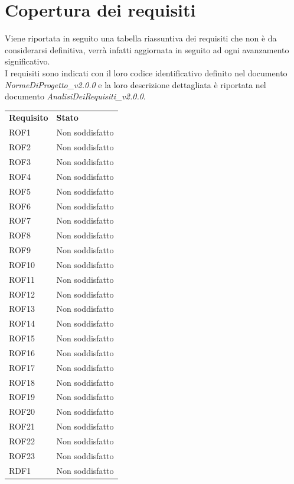 \section{Copertura dei requisiti}
Viene riportata in seguito una tabella riassuntiva dei requisiti che non è da considerarsi definitiva, verrà infatti aggiornata in seguito ad ogni avanzamento significativo. \\
I requisiti sono indicati con il loro codice identificativo definito nel documento \textit{NormeDiProgetto\_v2.0.0} e la loro descrizione dettagliata è riportata nel documento \textit{AnalisiDeiRequisiti\_v2.0.0}.
\begin{longtable}{| p{2.5cm} | p{3cm} |}
	\rowcolor{LightBlue}
	\color{white}\bfseries Requisito & \color{white}\bfseries Stato \\
	ROF1 & Non soddisfatto \\ \hline
	ROF2 & Non soddisfatto \\ \hline
	ROF3 & Non soddisfatto \\ \hline
	ROF4 & Non soddisfatto \\ \hline
	ROF5 & Non soddisfatto \\ \hline
	ROF6 & Non soddisfatto \\ \hline
	ROF7 & Non soddisfatto \\ \hline
	ROF8 & Non soddisfatto \\ \hline
	ROF9 & Non soddisfatto \\ \hline
	ROF10 & Non soddisfatto \\ \hline
	ROF11 & Non soddisfatto \\ \hline
	ROF12 & Non soddisfatto \\ \hline
	ROF13 & Non soddisfatto \\ \hline
	ROF14 & Non soddisfatto \\ \hline
	ROF15 & Non soddisfatto \\ \hline
	ROF16 & Non soddisfatto \\ \hline
	ROF17 & Non soddisfatto \\ \hline
	ROF18 & Non soddisfatto \\ \hline
	ROF19 & Non soddisfatto \\ \hline
	ROF20 & Non soddisfatto \\ \hline
	ROF21 & Non soddisfatto \\ \hline
	ROF22 & Non soddisfatto \\ \hline
	ROF23 & Non soddisfatto \\ \hline
	RDF1 & Non soddisfatto \\ \hline

\end{longtable}
